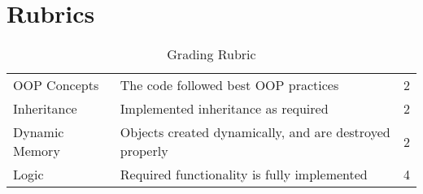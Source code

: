 \documentclass[a4paper,12pt]{article}
\begin{document}
\section{Rubrics}
	\begin{table}[h]
	\centering
	\begin{tabular}{llc}
		\toprule

		OOP Concepts & The code followed best OOP practices &  2\\
		Inheritance & Implemented inheritance as required & 2\\
		Dynamic Memory & Objects created dynamically, and are destroyed properly & 2\\
		Logic	& Required functionality is fully implemented	& 4 \\
		\bottomrule
	\end{tabular}
	\caption{Grading Rubric}
	\label{Grading}
	\end{table}
	
\end{document}
